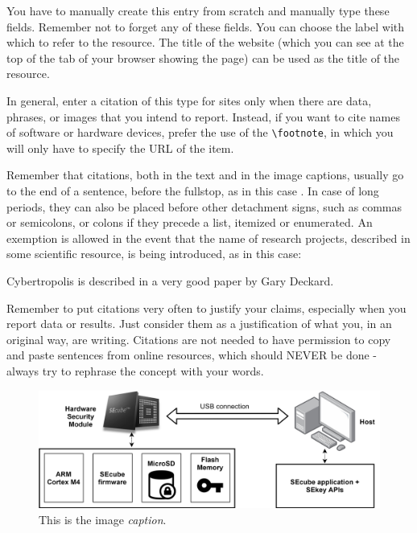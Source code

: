 You have to manually create this entry from scratch and manually type these fields. Remember not to forget any of these fields. You can choose the label with which to refer to the resource. The title of the website (which you can see at the top of the tab of your browser showing the page) can be used as the title of the resource.

In general, enter a citation of this type for sites only when there are data, phrases, or images that you intend to report. Instead, if you want to cite names of software or hardware devices, prefer the use of the \lstinline{\footnote}, in which you will only have to specify the URL of the item.

Remember that citations, both in the text and in the image captions, usually go to the end of a sentence, before the fullstop, as in this case \cite{vykopal2017kypo}. In case of long periods, they can also be placed before other detachment signs, such as commas or semicolons, or colons if they precede a list, itemized or enumerated. An exemption is allowed in the event that the name of research projects, described in some scientific resource, is being introduced, as in this case:

\begin{center}
	Cybertropolis \cite{deckard2018cybertropolis} is described in a very good paper by Gary Deckard.
\end{center}

Remember to put citations very often to justify your claims, especially when you report data or results. Just consider them as a justification of what you, in an original way, are writing. Citations are not needed to have permission to copy and paste sentences from online resources, which should NEVER be done - always try to rephrase the concept with your words.

\begin{figure}[h!]
	\vspace{0.5cm}
	\includegraphics[width=\textwidth]{images/simplearch.jpg}
	\caption{This is the image \emph{caption}.}
	\label{fig:generalschema} %
\end{figure}

